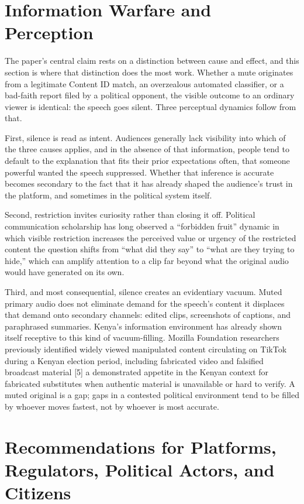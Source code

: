 \documentclass{article}
\begin{document}
\section{Information Warfare and Perception}
The paper’s central claim rests on a distinction between cause and effect, and this section is where that distinction does the most work. Whether a mute originates from a legitimate Content ID match, an overzealous automated classifier, or a bad-faith report filed by a political opponent, the visible outcome to an ordinary viewer is identical: the speech goes silent. Three perceptual dynamics follow from that.
\par 
First, silence is read as intent. Audiences generally lack visibility into which of the three causes applies, and in the absence of that information, people tend to default to the explanation that fits their prior expectations often, that someone powerful wanted the speech suppressed. Whether that inference is accurate becomes secondary to the fact that it has already shaped the audience’s trust in the platform, and sometimes in the political system itself.
\par 
Second, restriction invites curiosity rather than closing it off. Political communication scholarship has long observed a “forbidden fruit” dynamic in which visible restriction increases the perceived value or urgency of the restricted content the question shifts from “what did they say” to “what are they trying to hide,” which can amplify attention to a clip far beyond what the original audio would have generated on its own.
\par
Third, and most consequential, silence creates an evidentiary vacuum. Muted primary audio does not eliminate demand for the speech’s content it displaces that demand onto secondary channels: edited clips, screenshots of captions, and paraphrased summaries. Kenya’s information environment has already shown itself receptive to this kind of vacuum-filling. Mozilla Foundation researchers previously identified widely viewed manipulated content circulating on TikTok during a Kenyan election period, including fabricated video and falsified broadcast material [5] a demonstrated appetite in the Kenyan context for fabricated substitutes when authentic material is unavailable or hard to verify. A muted original is a gap; gaps in a contested political environment tend to be filled by whoever moves fastest, not by whoever is most accurate.
\section{Recommendations for Platforms, Regulators, Political Actors, and Citizens}
\end{document}
